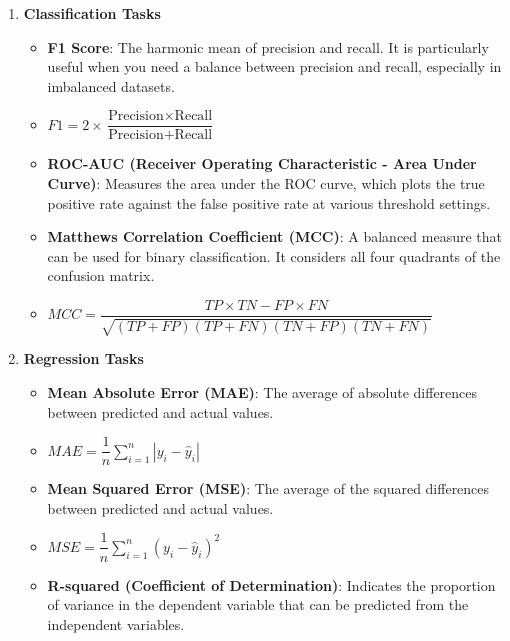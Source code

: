 \documentclass[a4paper, utf8]{ctexart}
\begin{document}
	\begin{enumerate}
		\item \textbf{Classification Tasks}
	
		\begin{itemize}
	    	\item \textbf{F1 Score}: The harmonic mean of precision and recall. It is particularly useful when you need a balance between precision and recall, especially in imbalanced datasets.
	    	
	    	\item[] $F1 = 2 \times \dfrac{\text{Precision} \times \text{Recall}}{\text{Precision} + \text{Recall}}$
	    	
	    	\item \textbf{ROC-AUC (Receiver Operating Characteristic - Area Under Curve)}: Measures the area under the ROC curve, which plots the true positive rate against the false positive rate at various threshold settings.
	    	
	    	\item \textbf{Matthews Correlation Coefficient (MCC)}: A balanced measure that can be used for binary classification. It considers all four quadrants of the confusion matrix.
	    	
	    	\item[] $MCC = \dfrac{TP \times TN - FP \times FN}{\sqrt{(TP + FP)(TP + FN)(TN + FP)(TN + FN)}}$
		\end{itemize}
	
		\item \textbf{Regression Tasks}
	
		\begin{itemize}
	    	\item \textbf{Mean Absolute Error (MAE)}: The average of absolute differences between predicted and actual values.
	    	
	    	\item $MAE = \dfrac{1}{n} \sum_{i=1}^{n} |y_i - \hat{y}_i| $
	    	
	    	\item \textbf{Mean Squared Error (MSE)}: The average of the squared differences between predicted and actual values.
	    	
	    	\item[] $MSE = \dfrac{1}{n} \sum_{i=1}^{n} (y_i - \hat{y}_i)^2$
	    	
	    	\item \textbf{R-squared (Coefficient of Determination)}: Indicates the proportion of variance in the dependent variable that can be predicted from the independent variables.


\end{itemize}
\end{enumerate}
\end{document}
